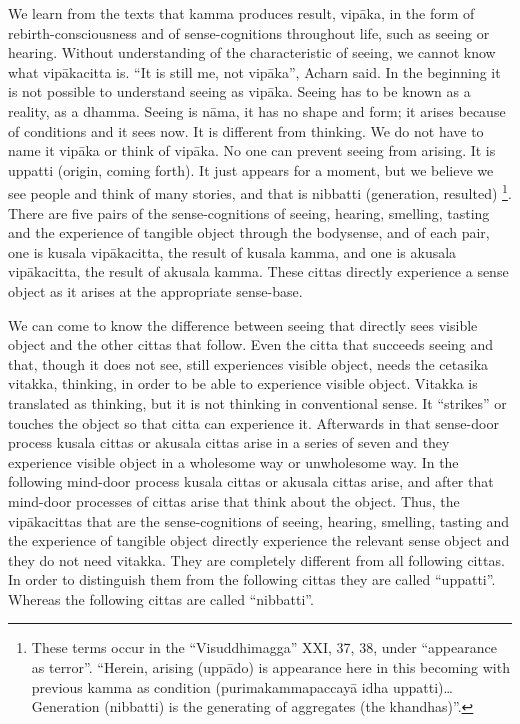 We learn from the texts that kamma produces result, vipāka, in the form
of rebirth-consciousness and of sense-cognitions throughout life, such
as seeing or hearing. Without understanding of the characteristic of
seeing, we cannot know what vipākacitta is. ``It is still me, not
vipāka'', Acharn said. In the beginning it is not possible to understand
seeing as vipāka. Seeing has to be known as a reality, as a dhamma.
Seeing is nāma, it has no shape and form; it arises because of
conditions and it sees now. It is different from thinking. We do not
have to name it vipāka or think of vipāka. No one can prevent seeing
from arising. It is uppatti (origin, coming forth). It just appears for
a moment, but we believe we see people and think of many stories, and
that is nibbatti (generation, resulted)
\footnote{These terms occur in
the ``Visuddhimagga'' XXI, 37, 38, under ``appearance as terror''.
``Herein, arising (uppādo) is appearance here in this becoming
with previous kamma as condition (purimakammapaccayā idha
uppatti)\ldots{} Generation (nibbatti) is the generating of aggregates
(the khandhas)''.}. There are five pairs
of the sense-cognitions of seeing, hearing, smelling, tasting and the
experience of tangible object through the bodysense, and of each pair,
one is kusala vipākacitta, the result of kusala kamma, and one is
akusala vipākacitta, the result of akusala kamma. These cittas directly
experience a sense object as it arises at the appropriate sense-base.

We can come to know the difference between seeing that directly sees
visible object and the other cittas that follow. Even the citta that
succeeds seeing and that, though it does not see, still experiences
visible object, needs the cetasika vitakka, thinking, in order to be
able to experience visible object. Vitakka is translated as thinking,
but it is not thinking in conventional sense. It ``strikes'' or touches
the object so that citta can experience it. Afterwards in that
sense-door process kusala cittas or akusala cittas arise in a series of
seven and they experience visible object in a wholesome way or
unwholesome way. In the following mind-door process kusala cittas or
akusala cittas arise, and after that mind-door processes of cittas arise
that think about the object. Thus, the vipākacittas that are the
sense-cognitions of seeing, hearing, smelling, tasting and the
experience of tangible object directly experience the relevant sense
object and they do not need vitakka. They are completely different from
all following cittas. In order to distinguish them from the following
cittas they are called ``uppatti''. Whereas the following cittas are
called ``nibbatti''.

